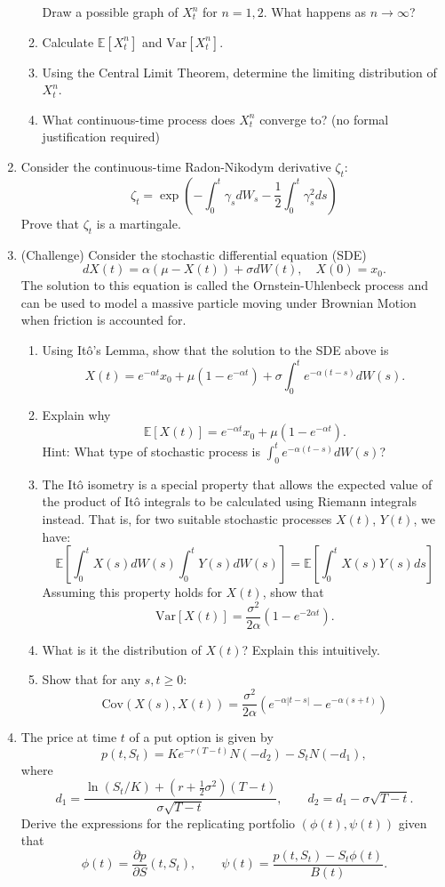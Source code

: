 \documentclass[11pt]{article}
\newcommand{\E}{\mathbb{E}}
\begin{document}
\begin{enumerate}
\begin{enumerate}
			Draw a possible graph of $X^{n}_{t}$ for $n=1,2$. What happens as $n\to\infty$?
			\item Calculate $\E[X^{n}_{t}]$ and $\text{Var}[X^{n}_{t}]$.
			\item Using the Central Limit Theorem, determine the limiting distribution of $X^{n}_{t}$.
			\item What continuous-time process does $X^{n}_{t}$ converge to? (no formal justification required)
		\end{enumerate}
		\item Consider the continuous-time Radon-Nikodym derivative $\zeta_t$:
		\[	\zeta_t = \exp\left(-\int_{0}^{t}\gamma_{s}dW_s -\frac{1}{2} \int_{0}^{t}\gamma_{s}^{2}ds\right)
		\]
		Prove that $\zeta_t$ is a martingale.
		\item (Challenge) Consider the stochastic differential equation (SDE)
		\[	dX(t) = \alpha(\mu - X(t))+ \sigma dW(t),\quad X(0) = x_{0}.
		\]
		The solution to this equation is called the Ornstein-Uhlenbeck process and can be used to model a massive particle moving under Brownian Motion when friction is accounted for.
		\begin{enumerate}
			\item Using It\^{o}'s Lemma, show that the solution to the SDE above 
			is 
			\[	X(t) = e^{-\alpha t}x_{0} + \mu(1 - e^{-\alpha t}) + \sigma\int_{0}^{t}e^{-\alpha(t - s)}dW(s).
			\]
			\item Explain why 
			\[	\E[X(t)] = e^{-\alpha t}x_{0} + \mu(1 - e^{-\alpha t}).
			\]
			Hint: What type of stochastic process is $\int_{0}^{t}e^{-\alpha(t - s)}dW(s)$?
			\item The It\^{o} isometry is a special property that allows the expected value of the product of It\^{o} integrals to be calculated using Riemann integrals instead. That is, for two suitable stochastic processes $X(t)$, $Y(t)$, we have:
			\[	\E\left[\int_{0}^{t}X(s)dW(s)\int_{0}^{t}Y(s)dW(s)\right]
			= \E\left[\int_{0}^{t}X(s)Y(s)ds\right]
			\]
			Assuming this property holds for $X(t)$, show that
			\[	\text{Var}[X(t)] = \frac{\sigma^{2}}{2\alpha}(1 - e^{-2\alpha t}).
			\]
			\item What is it the distribution of $X(t)$? Explain this intuitively.
			\item Show that for any $s, t\geq 0$:
			\[	\text{Cov}(X(s), X(t)) = \frac{\sigma^{2}}{2\alpha}(e^{-\alpha|t - s|} - e^{-\alpha(s + t)})
			\]
		\end{enumerate}
		\item The price at time $t$ of a put option is given by 
		\[		p(t, S_t) = Ke^{-r(T - t)}N(-d_{2}) - S_t N(-d_1),
		\]
		where
		\[		d_{1} = \frac{\ln(S_t/ K) + (r + \frac{1}{2}\sigma^2)(T -t)}{\sigma \sqrt{T - t}},\qquad d_{2} = d_{1} - \sigma \sqrt{T - t}.
		\]
		Derive the expressions for the replicating portfolio $(\phi(t), \psi(t))$ given that
		\[		\phi(t) = \frac{\partial p}{\partial S}(t, S_t),\qquad \psi(t)=\frac{p(t, S_t) - S_t \phi(t)}{B(t)}.
		\]
	\end{enumerate}
\end{document}
